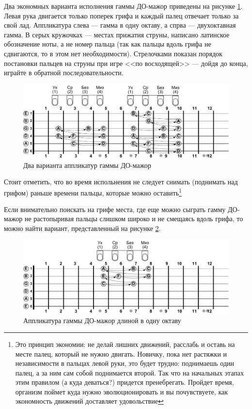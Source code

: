 Два экономных варианта исполнения гаммы ДО-мажор приведены на рисунке \ref{fig:harmony:scales:c:dur1}. Левая рука двигается только поперек грифа и каждый палец отвечает только за свой лад. Аппликатура слева --- гамма в одну октаву, а спрва --- двухоктавная гамма. В серых кружочках --- местах прижатия струны, написано латинское обозначение ноты, а не номер пальца (так как пальцы вдоль грифа не сдвигаются, то в этом нет необходимости). Стрелочками показан порядок постановки пальцев на струны при игре <<по восходящей>> --- дойдя до конца, играйте в обратной последовательности.

\begin{figure}[!ht]
    \centering
    \includegraphics[width=\textwidth]{fig/intervals/c-dur-csale-1} 
    \caption{Два варианта аппликатур гаммы ДО-мажор}\label{fig:harmony:scales:c:dur1}
\end{figure} 

Стоит отметить, что во время испольнения не следует снимать (поднимать над грифом) раньше времени пальцы, которые можно оставить\footnote{Это принцип экономии: не делай лишних движений, расслабь и оставь на месте палец, который не нужно двигать. Новичку, пока нет растяжки и независимости в пальцах левой руки, это будет трудно: поднимаешь один палец, а за ним сам собой поднимается второй. Так что на начальных этапах этим правилом (а куда деваться?) придется пренебрегать. Пройдет время, организм поймет куда нужно эволюционировать и вы почувствуете, как экономность движений доставляет удовольствие}

Если внимательно поискать на грифе места, где еще можно сыграть гамму ДО-мажор не растопыривая пальцы слишком широко и не смещаясь вдоль грифа, то можно найти вариант, представленный на рисунке \ref{fig:harmony:scales:c:dur2}.

\begin{figure}[!ht]
    \centering
    \includegraphics[width=\textwidth]{fig/intervals/c-dur-csale-2} 
    \caption{Аппликатура гаммы ДО-мажор длиной в одну октаву}\label{fig:harmony:scales:c:dur2}
\end{figure} 

